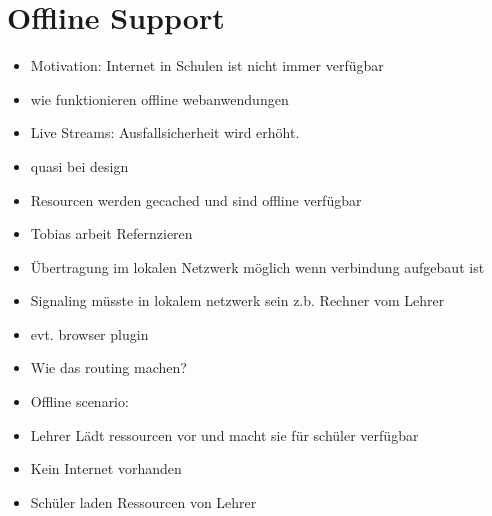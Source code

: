\section{Offline Support}
\begin{itemize}
	\item Motivation: Internet in Schulen ist nicht immer verfügbar
	\item wie funktionieren offline webanwendungen
	\item Live Streams: Ausfallsicherheit wird erhöht.
	\item quasi bei design
	\item Resourcen werden gecached und sind offline verfügbar
	\item Tobias arbeit Refernzieren
	\item Übertragung im lokalen Netzwerk möglich wenn verbindung aufgebaut ist
	\item Signaling müsste in lokalem netzwerk sein z.b. Rechner vom Lehrer
	\item 	evt. browser plugin
	\item 	Wie das routing machen?
	\item Offline scenario:
	\item 	Lehrer Lädt ressourcen vor und macht sie für schüler verfügbar
	\item 	Kein Internet vorhanden
	\item 	Schüler laden Ressourcen von Lehrer
\end{itemize}

